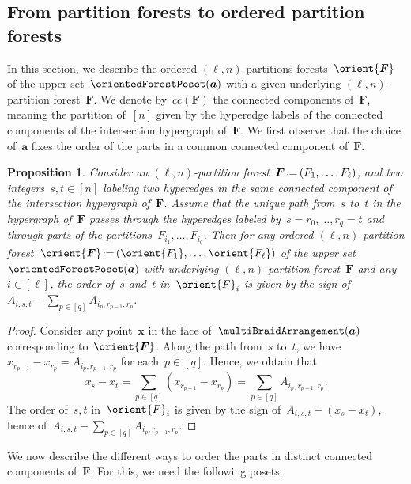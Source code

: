 \documentclass{amsart}
\newtheorem{proposition}[theorem]{Proposition}
\theoremstyle{definition}
\renewcommand{\b}[1]{{\boldsymbol{#1}}} %
\newcommand{\eqdef}{\mbox{\,\raisebox{0.2ex}{\scriptsize\ensuremath{\mathrm:}}\ensuremath{=}\,}} %
\renewcommand{\b}[1]{\boldsymbol{#1}} %
\begin{document}

\subsection{From partition forests to ordered partition forests}
\label{subsec:PFtoOPF}

In this section, we describe the ordered $(\ell,n)$-partitions forests~$\orient{\b{F}}$ of the upper set~$\orientedForestPoset(\b{a})$ with a given underlying $(\ell,n)$-partition forest~$\b{F}$.
We denote by~$cc(\b{F})$ the connected components of~$\b{F}$, meaning the partition of~$[n]$ given by the hyperedge labels of the connected components of the intersection hypergraph of~$\b{F}$.
We first observe that the choice of~$\b{a}$ fixes the order of the parts in a common connected component of~$\b{F}$.

\begin{proposition}
\label{prop:PFtoOPF1}
Consider an $(\ell,n)$-partition forest~$\b{F} \eqdef (F_1, \dots, F_\ell)$, and two integers~$s,t \in [n]$ labeling two hyperedges in the same connected component of the intersection hypergraph of~$\b{F}$.
Assume that the unique path from~$s$ to~$t$ in the hypergraph of~$\b{F}$ passes through the hyperedges labeled by~$s = r_0, \dots, r_q = t$ and through parts of the partitions~$F_{i_1}, \dots, F_{i_q}$.
Then for any ordered $(\ell,n)$-partition forest~$\orient{\b{F}} \eqdef (\orient{F_1}, \dots, \orient{F_\ell})$ of the upper set~$\orientedForestPoset(\b{a})$ with underlying $(\ell,n)$-partition forest~$\b{F}$ and any~$i \in [\ell]$, the order of~$s$ and~$t$ in~$\orient{F}_i$ is given by the sign of~$A_{i,s,t} - \sum_{p \in [q]} A_{i_p, r_{p-1}, r_p}$.
\end{proposition}

\begin{proof}
Consider any point~$\b{x}$ in the face of~$\multiBraidArrangement(\b{a})$ corresponding to~$\orient{\b{F}}$.
Along the path from~$s$ to~$t$, we have~$x_{r_{p-1}} - x_{r_p} = A_{i_p, r_{p-1}, r_p}$ for each~$p \in [q]$.
Hence, we obtain that
\[
x_s - x_t = \sum_{p \in [q]}  (x_{r_{p-1}} - x_{r_p}) = \sum_{p \in [q]} A_{i_p, r_{p-1}, r_p}.
\]
The order of~$s,t$ in~$\orient{F}_i$ is given by the sign of~$A_{i,s,t} - (x_s - x_t)$, hence of~$A_{i,s,t} - \sum_{p \in [q]} A_{i_p, r_{p-1}, r_p}$.
\end{proof}

We now describe the different ways to order the parts in distinct connected components of~$\b{F}$.
For this, we need the following posets.
\end{document}

